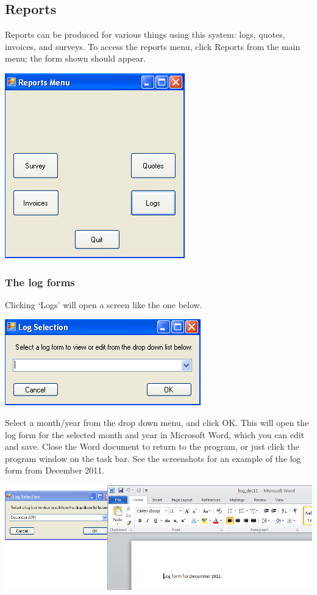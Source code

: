 	\subsection{Reports}
	
	Reports can be produced for various things using this system: logs, quotes, invoices, and surveys.  To access the reports menu, click Reports from the main menu; the form shown should appear.
	
	\includegraphics[scale=0.5]{frmReportMenu_scrot}
	
		\subsubsection{The log forms}
		
		Clicking `Logs' will open a screen like the one below.
		
		\includegraphics[scale=0.5]{frmReportLog_scrot}
		
		Select a month\slash year from the drop down menu, and click OK.  This will open the log form for the selected month and year in Microsoft Word, which you can edit and save.  Close the Word document to return to the program, or just click the program window on the task bar.  See the screenshots for an example of the log form from December 2011.
	
	\includegraphics[scale=0.5]{log-dec11-select-word_scrot}
	
